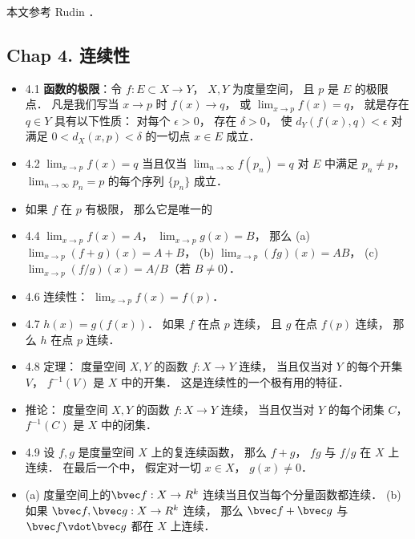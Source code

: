 
本文参考 Rudin \cite{Rudin}．

\subsection{Chap 4. 连续性}

\begin{itemize}
\item 4.1 \textbf{函数的极限}：令 $f:E\subset X\to Y$， $X,Y$ 为度量空间， 且 $p$ 是 $E$ 的极限点． 凡是我们写当 $x\to p$ 时 $f(x)\to q$， 或 $\lim_{x\to p}f(x)=q$， 就是存在 $q\in Y$ 具有以下性质： 对每个 $\epsilon>0$， 存在 $\delta>0$， 使 $d_{Y}(f(x),q)<\epsilon$ 对满足 $0<d_X(x,p)<\delta$ 的一切点 $x\in E$ 成立．

\item 4.2 $\lim_{x\to p}f(x)=q$ 当且仅当 $\lim_{n\to\infty} f(p_n)=q$ 对 $E$ 中满足 $p_n\ne p$， $\lim_{n\to\infty} p_n=p$ 的每个序列 $\{p_n\}$ 成立．

\item 如果 $f$ 在 $p$ 有极限， 那么它是唯一的

\item 4.4 $\lim_{x\to p}f(x)=A$， $\lim_{x\to p}g(x)=B$， 那么 (a) $\lim_{x\to p}(f+g)(x)=A+B$， (b) $\lim_{x\to p}(fg)(x)=AB$， (c) $\lim_{x\to p}(f/g)(x)=A/B$（若 $B\ne 0$）．

\item 4.6 连续性： $\lim_{x\to p}f(x)=f(p)$．

\item 4.7 $h(x) = g(f(x))$． 如果 $f$ 在点 $p$ 连续， 且 $g$ 在点 $f(p)$ 连续， 那么 $h$ 在点 $p$ 连续．

\item 4.8 定理： 度量空间 $X,Y$ 的函数 $f:X\to Y$ 连续， 当且仅当对 $Y$ 的每个开集 $V$， $f^{-1}(V)$ 是 $X$ 中的开集． 这是连续性的一个极有用的特征．

\item 推论： 度量空间 $X,Y$ 的函数 $f:X\to Y$ 连续， 当且仅当对 $Y$ 的每个闭集 $C$， $f^{-1}(C)$ 是 $X$ 中的闭集．

\item 4.9 设 $f,g$ 是度量空间 $X$ 上的复连续函数， 那么 $f+g$， $fg$ 与 $f/g$ 在 $X$ 上连续． 在最后一个中， 假定对一切 $x\in X$， $g(x)\ne 0$．

\item (a) 度量空间上的$\bvec f:X\to R^k$ 连续当且仅当每个分量函数都连续． (b) 如果 $\bvec f, \bvec g:X\to R^k$ 连续， 那么 $\bvec f+\bvec g$ 与 $\bvec f\vdot \bvec g$ 都在 $X$ 上连续．


\end{itemize}
